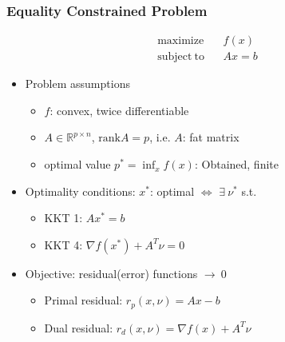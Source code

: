 \subsubsection*{Equality Constrained Problem}
$$ \begin{aligned}
    \mathrm{maximize}~~&~~f(x) \\
    \mathrm{subject~to}~~&~~Ax=b
\end{aligned} $$
\begin{itemize}
    \item Problem assumptions
    \begin{itemize}
        \item $f$: convex, twice differentiable
        \item $A\in\mathbb{R}^{p\times n}$, $\mathrm{rank}A=p$, i.e. $A$: fat matrix
        \item optimal value $p^\ast = \inf_x f(x)$: Obtained, finite
    \end{itemize}
    \newpage
    \item Optimality conditions: $x^\ast$: optimal $\Leftrightarrow$ $\exists~\nu^\ast$ s.t.
    \begin{itemize}
        \item KKT 1: $Ax^\ast=b$
        \item KKT 4: $\nabla f(x^\ast)+A^T\nu=0$
    \end{itemize}
    \item Objective: residual(error) functions $\rightarrow~0$
    \begin{itemize}
        \item Primal residual: $r_p(x,\nu)=Ax-b$
        \item Dual residual: $r_d(x,\nu)=\nabla f(x)+A^T\nu$
    \end{itemize}
\end{itemize}

